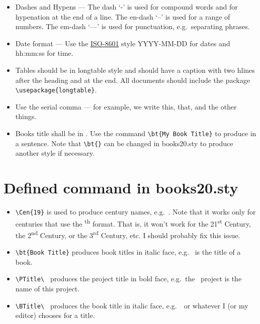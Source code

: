 \documentclass{article}
\begin{document}
\begin{itemize}

\item Dashes and Hypens --- The dash `-' is used for compound words and for
  hypenation at the end of a line.  The en-dash `--' is used for a range
  of numbers. The em-dash `---' is used for punctuation,
  e.g.\ separating phrases.

\item Date format --- Use the
  \href{https://en.wikipedia.org/wiki/ISO_8601}{ISO-8601} style
  YYYY-MM-DD for dates and hh:mm:ss for time.

\item Tables should be in longtable style and should have a caption with two
  hlines after the heading and at the end.  All documents should include
  the package \verb|\usepackage{longtable}|.

\item Use the serial comma --- for example, we write this, that, and the
  other things.

\item Books title shall be in . Use the command
  \verb|\bt{My Book Title}| to produce  in a
  sentence. Note that \verb|\bt{}| can be changed in books20.sty
  to produce another style if necessary.

\end{itemize}


\section{Defined command in books20.sty}

\begin{itemize}

\item \verb|\Cen{19}| is used to produce century names,
  e.g.\ . Note that it works only for centuries that use the
  \textsuperscript{th} format.  That is, it won't work for the
  21\textsuperscript{st} Century, the 2\textsuperscript{nd} Century, or the
  3\textsuperscript{rd} Century, etc. I should probably fix this issue.

\item \verb|\bt{Book Title}| produces book titles in italic face,
e.g.\  is the title of a book.

\item \verb|\PTitle\ | produces the project title in bold face,
  e.g.\ the \PTitle\ project is the name of this project.

\item \verb|\BTitle\ | produces the book title in italic face, e.g.\ \BTitle\ or whatever I (or my editor) chooses for a title.

\end{itemize}
\end{document}
